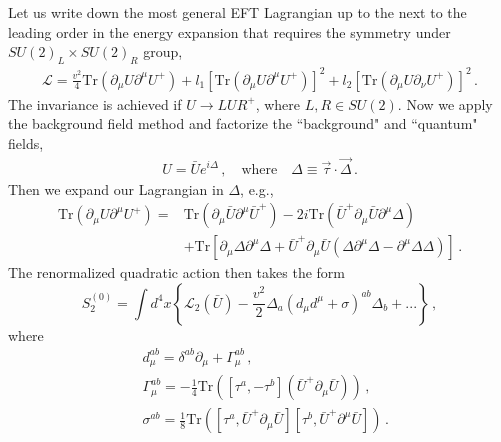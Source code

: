 \documentclass[11pt,a4paper]{article}
\newcommand{\be}{\begin{equation}}
\newcommand{\ee}{\end{equation}}
\newcommand\m{\mu}
\newcommand\n{\nu}
\def\d{\partial}
\begin{document}
Let us write down the most general EFT Lagrangian up to the next to the leading order in the energy expansion that requires the symmetry under $SU(2)_L\times SU(2)_R$ group,
\be
\begin{split}
\mathcal{L}=\frac{v^2}{4}\text{Tr}\left(\d_\m U \d^\m U^+\right)
+l_1[\text{Tr}\left(\d_\m U \d^\m U^+\right)]^2+l_2[\text{Tr}\left(\d_\m U \d_\n U^+\right)]^2\,.
\end{split}
\ee
The invariance is achieved if $U\to L U R^+$, where $L,R\in SU(2)$. Now we apply the background field method and factorize the ``background" and ``quantum" fields,
\be
\begin{split}
U=\bar Ue^{i\Delta}\,,\quad \text{where}\quad \Delta \equiv \vec{\tau}\cdot \vec{\Delta}\,.
\end{split}
\ee
Then we expand our Lagrangian in $\Delta$, e.g.,
\be
\begin{split}
\text{Tr}\left(\d_\m U \d^\m U^+\right)=
&\text{Tr}\left(\d_\m \bar U \d^\m \bar U^+\right)
-2i\text{Tr}\left(\bar U^+\d_\m \bar U \d^\m \Delta \right)\\
&+\text{Tr}\left[\d_\m  \Delta \d^\m \Delta +\bar U^+ \d_\m \bar U(\Delta \d^\m \Delta-\d^\m \Delta \Delta)\right]\,.
\end{split}
\ee
The renormalized quadratic action then takes the form
\be
S_2^{(0)}=\int d^4x \left\{\mathcal{L}_2(\bar U)-\frac{v^2}{2}\Delta_a(d_\m d^\m+\sigma)^{ab}\Delta_b+... \right\}\,,
\ee
where
\be
\begin{split}
& d_\m^{ab}=\delta^{ab} \d_\m+ \Gamma_\m^{ab}\,,\\
& \Gamma_\m^{ab}=-\frac{1}{4}\text{Tr}\left([\tau^a,-\tau^b](\bar U^+\d_\m \bar U)\right)\,,\\
& \sigma^{ab}=\frac{1}{8}\text{Tr}\left([\tau^a,\bar U^+ \d_\m \bar U][\tau^b,\bar U^+ \d^\m \bar U]\right)\,.
\end{split}
\ee
\end{document}
